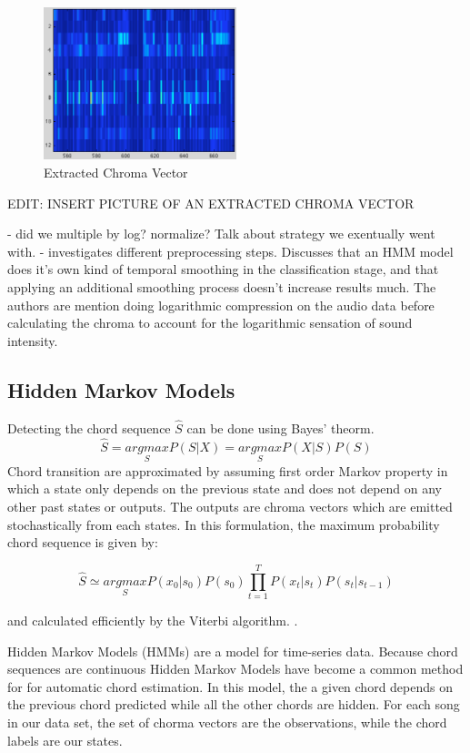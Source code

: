 \documentclass{article}
\begin{document}
\begin{figure}
   \centering
    \includegraphics[width=0.5\textwidth]{187.png}
   \caption{Extracted Chroma Vector}
   \label{fig:Chroma}
\end{figure}

EDIT: INSERT PICTURE OF AN EXTRACTED CHROMA VECTOR

- did we multiple by log? normalize? Talk about strategy we exentually went with.
- \cite{Jiang:22} investigates different preprocessing steps. Discusses that
an HMM model does it's own kind of temporal smoothing in the classification
stage, and that applying an additional smoothing process doesn't increase results much.
The authors are mention doing logarithmic compression on the audio data before
calculating the chroma to account for the logarithmic sensation of sound intensity.

\subsection{Hidden Markov Models}

Detecting the chord sequence $\hat{S}$ can be done using Bayes' theorm.
$$\hat{S} = \underset{S}{argmax} P(S|X) = \underset{S}{argmax} P(X|S) P(S)$$
Chord transition are approximated by assuming first order Markov property in which a state only depends
on the previous state and does not depend on any other past states or outputs. The outputs are chroma
vectors which are emitted stochastically from each states. In this formulation, the maximum probability
chord sequence is given by:

$$\hat{S} \simeq  \underset{S}{argmax} P(x_{0}|s_{0}) P(s_{0}) \prod_{t=1}^{T} P(x_{t}|s_{t}) P(s_{t}|s_{t-1})$$

and calculated efficiently by the Viterbi algorithm. \cite{Ueda:01}.


Hidden Markov Models (HMMs) are a model for time-series data. Because chord sequences are continuous
Hidden Markov Models have become a common method for for automatic chord estimation. In this model, the
a given chord depends on the previous chord predicted while all the other chords are hidden. For each
song in our data set, the set of chorma vectors are the observations, while the chord labels are our states.
\end{document}
